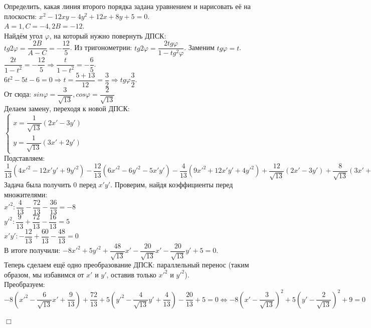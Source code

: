 \documentclass[a4paper, 12pt]{report}
\newenvironment{examp} %
{\par\noindent{\textbf{\textsc{Пример:}}}} %
{\hfill$\scriptstyle\Box$}
\begin{document}
\begin{examp}
	Определить, какая линия второго порядка задана уравнением и нарисовать её на плоскости:
	$x^2 - 12xy - 4y^2 + 12x + 8y + 5 = 0$.\\
	$A = 1, C = -4, 2B = -12$.\\
	Найдём угол $\varphi$, на который нужно повернуть ДПСК:\\
	$tg2\varphi = \dfrac{2B}{A - C} = -\dfrac{12}{5}$. Из тригонометрии: $tg2\varphi = \dfrac{2tg\varphi}{1 - tg^2\varphi}$. Заменим $tg\varphi = t$.\\
	$\dfrac{2t}{1-t^2} = -\dfrac{12}{5} \Rightarrow \dfrac{t}{1-t^2} = -\dfrac{6}{5}$.
	\\
	$6t^2 - 5t - 6 = 0 \Rightarrow t = \dfrac{5 + 13}{12} = \dfrac{3}{2} \Rightarrow tg\varphi \dfrac{3}{2}$.
	\\
	От сюда:
	$sin\varphi = \dfrac{3}{\sqrt{13}}, cos\varphi = \dfrac{2}{\sqrt{13}}$
	\\
	Делаем замену, переходя к новой ДПСК:
	\\
	$\begin{cases}
		x = \dfrac{1}{\sqrt{13}}(2x'-3y') \\
		y = \dfrac{1}{\sqrt{13}}(3x' + 2y')
	\end{cases}$
	\\
	Подставляем:
	\\
	$\dfrac{1}{13}(4x'^2 - 12x'y' + 9y'^2) - \dfrac{12}{13}(6x'^2 - 6y'^2 - 5x'y') - \dfrac{4}{13}(9x'^2 + 12x'y' + 4y'^2) + \dfrac{12}{\sqrt{13}}(2x'-3y') + \dfrac{8}{\sqrt{13}}(3x'+2y') + 5 = 0$
	\\
	Задача была получить 0 перед $x'y'$. Проверим, найдя коэффициенты перед множителями:
	\\
	$x'^2: \dfrac{4}{13} - \dfrac{72}{13} - \dfrac{36}{13} = -8$
	\\
	$y'^2: \dfrac{9}{13} + \dfrac{72}{13} - \dfrac{16}{13} = 5$
	\\
	$x'y': -\dfrac{12}{13} + \dfrac{60}{13} - \dfrac{48}{13} = 0$
	\\
	В итоге получили: $-8x'^2 + 5y'^2 + \dfrac{48}{\sqrt{13}}x' - \dfrac{20}{\sqrt{13}}x' - \dfrac{20}{\sqrt{13}}y' + 5 = 0$.
	\\
	Теперь сделаем ещё одно преобразование ДПСК: параллельный перенос (таким образом, мы избавимся от $x'$ и $y'$, оставив только $x'^2$ и $y'^2$).
	\\
	Преобразуем: $-8(x'^2 - \dfrac{6}{\sqrt{13}}x' + \dfrac{9}{13}) + \dfrac{72}{13} + 5(y'^2 - \dfrac{4}{\sqrt{13}}y' + \dfrac{4}{13}) - \dfrac{20}{13} + 5 = 0 \Leftrightarrow -8(x' - \dfrac{3}{\sqrt{13}})^2 + 5(y' - \dfrac{2}{\sqrt{13}})^2 + 9 = 0$

\end{examp}
\end{document}

